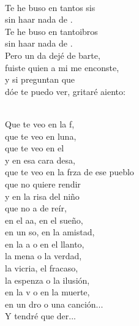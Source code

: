 \documentclass[12pt]{article}
\begin{document}
\begin{multicols*}{2}
\begin{cancion}%
	    \\
	Te he buso en tantos sis \\
	sin haar nada de . \\
	Te he buso en tantoibros\\
	sin haar nada de . \\
\jump
	Pero un da dejé de barte, \\
	fuiste  quien a mi me enconste, \\
	y si  preguntan que \\
	dóe te puedo ver, gritaré aiento:\\\jump\\
	\begin{chorus}%
	Que te veo en la f, \\
	que te veo en luna,\\
	que te veo en el  \\
	y en esa cara desa,\\
	que te veo en la frza de ese pueblo\\
	que no  quiere rendir\\
	y en la risa del niño \\
	que no a de reír,\\
	en el aa, en el sueño, \\
	en un so, en la amistad,\\
	en la a o en el llanto, \\
	la mena o la verdad,\\
	la vicria, el fracaso, \\
	la espenza o la ilusión,\\
	en la v o en la muerte, \\
	en un dro o una canción...\\
	Y tendré que der...\\

\end{chorus}
\end{cancion}
\end{multicols*}
\end{document}
